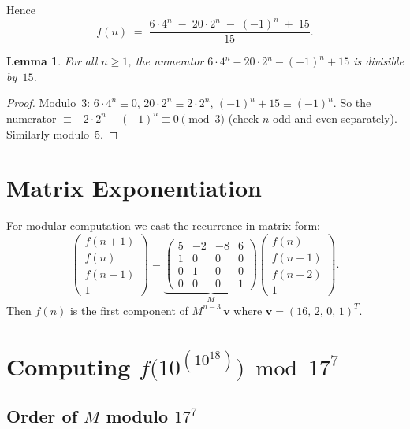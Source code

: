 \documentclass[11pt,a4paper]{article}
\newtheorem{lemma}[theorem]{Lemma}
\begin{document}
Hence
\[
  \boxed{f(n) \;=\; \frac{6\cdot 4^n \;-\; 20\cdot 2^n \;-\; (-1)^n \;+\; 15}{15}.}
\]

\begin{lemma}
For all $n\ge 1$, the numerator $6\cdot 4^n - 20\cdot 2^n - (-1)^n + 15$ is
divisible by~$15$.
\end{lemma}

\begin{proof}
Modulo~$3$: $6\cdot 4^n \equiv 0$, $20\cdot 2^n \equiv 2\cdot 2^n$,
$(-1)^n + 15 \equiv (-1)^n$.  So the numerator $\equiv -2\cdot 2^n - (-1)^n
\equiv 0\pmod{3}$ (check $n$ odd and even separately).
Similarly modulo~$5$.
\end{proof}

\section{Matrix Exponentiation}

For modular computation we cast the recurrence in matrix form:
\[
  \begin{pmatrix} f(n{+}1) \\ f(n) \\ f(n{-}1) \\ 1 \end{pmatrix}
  =
  \underbrace{\begin{pmatrix}
    5 & -2 & -8 & 6 \\
    1 &  0 &  0 & 0 \\
    0 &  1 &  0 & 0 \\
    0 &  0 &  0 & 1
  \end{pmatrix}}_{M}
  \begin{pmatrix} f(n) \\ f(n{-}1) \\ f(n{-}2) \\ 1 \end{pmatrix}.
\]
Then $f(n)$ is the first component of $M^{n-3}\,\mathbf{v}$ where
$\mathbf{v} = (16,\,2,\,0,\,1)^T$.

\section{Computing \texorpdfstring{$f\bigl(10^{(10^{18})}\bigr) \bmod 17^7$}{f(10\^(10\^18)) mod 17\^7}}

\subsection{Order of $M$ modulo $17^7$}
\end{document}
